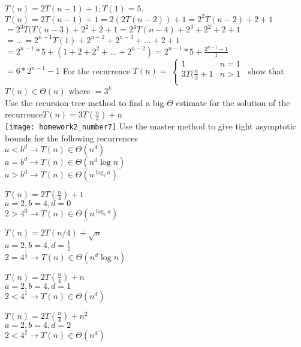 \documentclass[12pt,largemargins]{homework}
\begin{document}
\question
$T ( n ) = 2 T ( n-1 ) + 1 ; T ( 1 ) = 5 .$\\
$T(n) = 2T(n-1)+1 =  2(2T(n-2))+1 = 2^2T(n-2)+2+1$\\
$=2^3T(T(n-3)+2^2+2+1 = 2^4T(n-4)+2^3+2^2+2+1$\\
$=...=2^{n-1}T(1)+2^{n-2}+2^{n-3}+...+2+1$\\
$=2^{n-1}*5+(1+2+2^2+...+2^{n-2})=2^{n-1}*5+\frac{2^{n-1}-1}{1}$\\
$=6*2^{n-1}-1$
\question
For the recurrence $T(n)=
\ \begin{cases} 
      1 & n =1\\
      3T(\frac{n}{3} +1 & n >1\\
   \end{cases}
\,$ show that $T(n) \in \Theta(n)$
where $=3^k$\\
\newpage
\question
Use the recursion tree method to find a big-$ \Theta $ estimate for the solution of the recurrence$ T(n)=3T(\frac{n}{3})+n $\\
\texttt{[image: homework2\_number7]}
\question
Use the master method to give tight asymptotic bounds for the following recurrences\\
$ a < b^d \rightarrow T(n) \in  \Theta(n^d)$\\
$ a=b^d  \rightarrow T(n) \in \Theta (n^d\log n)$\\
$ a>b^d \rightarrow T(n) \in \Theta(n^{\log_b a}) $\\
\begin{alphaparts}
	\item 
	$ T(n) = 2T(\frac{n}{4})+1 $\\
	$ a = 2, b = 4, d=0 $\\
	$ 2 > 4^0 \rightarrow T(n) \in \Theta(n^{\log_b a})$\\
	\item 
	$ T(n)=2T(n/4) + \sqrt{n} $\\
	$ a=2,b=4,d=\frac{1}{2} $\\
	$ 2=4^{\frac{1}{2}} \rightarrow T(n) \in \Theta(n^d\log n) $\\
	\item 
	$ T(n) = 2T(\frac{n}{4})+n $\\
	$ a = 2, b = 4, d=1 $\\
	$ 2 < 4^1 \rightarrow T(n) \in \Theta(n^d)$\\
	\item 
	$ T(n) = 2T(\frac{n}{4})+n^2 $\\
	$ a = 2, b = 4, d=2 $\\
	$ 2 < 4^2 \rightarrow T(n) \in \Theta(n^d)$\\
\end{alphaparts}
\end{document}
